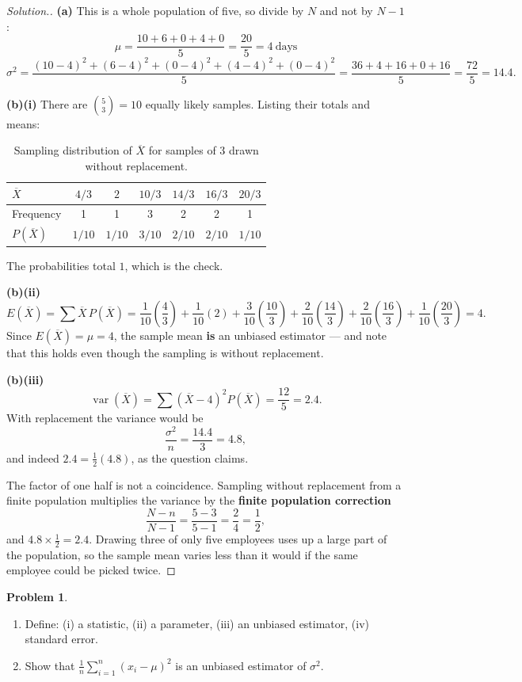 \documentclass[11pt,a4paper]{article}
\theoremstyle{definition}
\newtheorem{problemx}{Problem}[section]
\newenvironment{problem}{\begin{problemx}}{\end{problemx}}
\newenvironment{solution}
  {\renewcommand{\qedsymbol}{}\begin{proof}[\textit{Solution}.]}
  {\end{proof}}
\begin{document}
\begin{solution}
\textbf{(a)} This is a whole population of five, so divide by $N$ and not by $N-1$:
\[\mu=\frac{10+6+0+4+0}{5}=\frac{20}{5}=4\ \text{days}\]
\[\sigma^2=\frac{(10-4)^2+(6-4)^2+(0-4)^2+(4-4)^2+(0-4)^2}{5}=\frac{36+4+16+0+16}{5}=\frac{72}{5}=14.4.\]

\textbf{(b)(i)} There are $\binom{5}{3}=10$ equally likely samples. Listing their totals and
means:
\begin{table}[H]
\centering
\begin{tabular}{|l|c|c|c|c|c|c|}
\hline
$\overline{X}$ & $4/3$ & $2$ & $10/3$ & $14/3$ & $16/3$ & $20/3$\\
\hline
Frequency & 1 & 1 & 3 & 2 & 2 & 1\\
$P(\overline{X})$ & $1/10$ & $1/10$ & $3/10$ & $2/10$ & $2/10$ & $1/10$\\
\hline
\end{tabular}
\caption{Sampling distribution of $\overline{X}$ for samples of 3 drawn without replacement.}
\end{table}
The probabilities total $1$, which is the check.

\textbf{(b)(ii)}
\[E(\overline{X})=\sum \overline{X}\,P(\overline{X})
=\frac{1}{10}\left(\frac{4}{3}\right)+\frac{1}{10}(2)+\frac{3}{10}\left(\frac{10}{3}\right)
+\frac{2}{10}\left(\frac{14}{3}\right)+\frac{2}{10}\left(\frac{16}{3}\right)+\frac{1}{10}\left(\frac{20}{3}\right)=4.\]
Since $E(\overline{X})=\mu=4$, the sample mean \textbf{is} an unbiased estimator --- and
note that this holds even though the sampling is without replacement.

\textbf{(b)(iii)}
\[\operatorname{var}(\overline{X})=\sum\left(\overline{X}-4\right)^2 P(\overline{X})=\frac{12}{5}=2.4.\]
With replacement the variance would be
\[\frac{\sigma^2}{n}=\frac{14.4}{3}=4.8,\]
and indeed $2.4=\tfrac{1}{2}(4.8)$, as the question claims.

The factor of one half is not a coincidence. Sampling without replacement from a finite
population multiplies the variance by the \textbf{finite population correction}
\[\frac{N-n}{N-1}=\frac{5-3}{5-1}=\frac{2}{4}=\frac{1}{2},\]
and $4.8\times\frac{1}{2}=2.4$. Drawing three of only five employees uses up a large part of
the population, so the sample mean varies less than it would if the same employee could be
picked twice.
\end{solution}

\begin{problem}
\begin{enumerate}
\item[(a).] Define: (i) a statistic, (ii) a parameter, (iii) an unbiased estimator,
(iv) standard error.
\item[(b).] Show that $\frac{1}{n}\sum_{i=1}^{n}(x_i-\mu)^2$ is an unbiased estimator of
$\sigma^2$.
\end{enumerate}
\end{problem}
\end{document}
